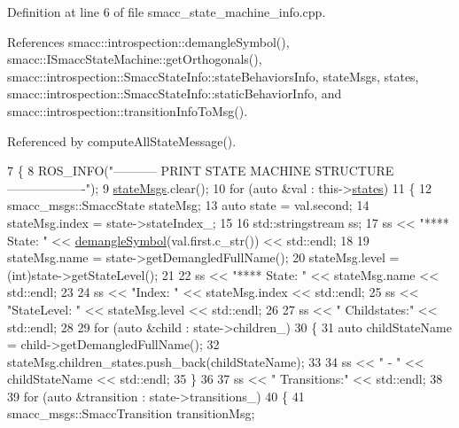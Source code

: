 Definition at line 6 of file smacc\+\_\+state\+\_\+machine\+\_\+info.\+cpp.



References smacc\+::introspection\+::demangle\+Symbol(), smacc\+::\+I\+Smacc\+State\+Machine\+::get\+Orthogonals(), smacc\+::introspection\+::\+Smacc\+State\+Info\+::state\+Behaviors\+Info, state\+Msgs, states, smacc\+::introspection\+::\+Smacc\+State\+Info\+::static\+Behavior\+Info, and smacc\+::introspection\+::transition\+Info\+To\+Msg().



Referenced by compute\+All\+State\+Message().


\begin{DoxyCode}
7 \{
8     ROS\_INFO(\textcolor{stringliteral}{"----------- PRINT STATE MACHINE STRUCTURE -------------------"});
9     \hyperlink{classsmacc_1_1introspection_1_1SmaccStateMachineInfo_a48e3ff7bbe2673d23e6942234446ebee}{stateMsgs}.clear();
10     \textcolor{keywordflow}{for} (\textcolor{keyword}{auto} &val : this->\hyperlink{classsmacc_1_1introspection_1_1SmaccStateMachineInfo_aef31d74ad3669f0b0f57fe0e008cd2f8}{states})
11     \{
12         smacc\_msgs::SmaccState stateMsg;
13         \textcolor{keyword}{auto} state = val.second;
14         stateMsg.index = state->stateIndex\_;
15 
16         std::stringstream ss;
17         ss << \textcolor{stringliteral}{"**** State: "} << \hyperlink{namespacesmacc_1_1introspection_a2f495108db3e57604d8d3ff5ef030302}{demangleSymbol}(val.first.c\_str()) << std::endl;
18 
19         stateMsg.name = state->getDemangledFullName();
20         stateMsg.level = (int)state->getStateLevel();
21 
22         ss << \textcolor{stringliteral}{"**** State: "} << stateMsg.name << std::endl;
23 
24         ss << \textcolor{stringliteral}{"Index: "} << stateMsg.index << std::endl;
25         ss << \textcolor{stringliteral}{"StateLevel: "} << stateMsg.level << std::endl;
26 
27         ss << \textcolor{stringliteral}{" Childstates:"} << std::endl;
28 
29         \textcolor{keywordflow}{for} (\textcolor{keyword}{auto} &child : state->children\_)
30         \{
31             \textcolor{keyword}{auto} childStateName = child->getDemangledFullName();
32             stateMsg.children\_states.push\_back(childStateName);
33 
34             ss << \textcolor{stringliteral}{" - "} << childStateName << std::endl;
35         \}
36 
37         ss << \textcolor{stringliteral}{" Transitions:"} << std::endl;
38 
39         \textcolor{keywordflow}{for} (\textcolor{keyword}{auto} &transition : state->transitions\_)
40         \{
41             smacc\_msgs::SmaccTransition transitionMsg;

\end{DoxyCode}
